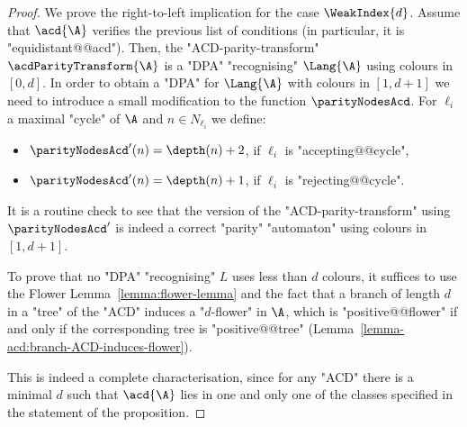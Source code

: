 \documentclass{theoretics}
\begin{document}
\begin{proof}
	We prove the right-to-left implication for the case $\WeakIndex{d}$.
	Assume that $\acd{\A}$ verifies the previous list of conditions (in particular, it is "equidistant@@acd"). Then, the "ACD-parity-transform" $\acdParityTransform{\A}$ is a "DPA" "recognising" $\Lang{\A}$ using colours in $[0,d]$. In order to obtain a "DPA" for $\Lang{\A}$ with colours in $[1,d+1]$ we need to introduce a small modification to the function $\parityNodesAcd$. For $\ell_i$ a maximal "cycle" of $\A$ and $n\in N_{\ell_i}$ we define: \begin{itemize}
		\item $\parityNodesAcd'(n) = \depth(n)+2$, if $\ell_i$ is "accepting@@cycle",
		\item $\parityNodesAcd'(n) = \depth(n) + 1$, if $\ell_i$ is "rejecting@@cycle".
	\end{itemize}
	It is a routine check to see that the version of the "ACD-parity-transform" using $\parityNodesAcd'$ is indeed a correct "parity" "automaton" using colours in $[1,d+1]$.
	
	To prove that no "DPA" "recognising" $L$ uses less than $d$ colours, it suffices to use the Flower Lemma~\ref{lemma:flower-lemma} and the fact that a branch of length $d$ in a "tree" of the "ACD" induces a "$d$-flower" in $\A$, which is "positive@@flower" if and only if the corresponding tree is "positive@@tree" (Lemma~\ref{lemma-acd:branch-ACD-induces-flower}).
	
	This is indeed a complete characterisation, since for any "ACD" there is a minimal $d$ such that $\acd{\A}$ lies in one and only one of the classes specified in the statement of the proposition.
\end{proof}
\end{document}
